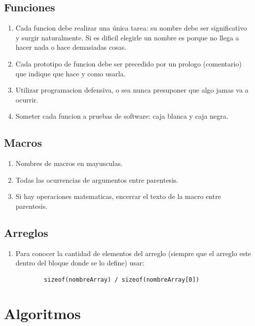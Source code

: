 \documentclass{article}
\begin{document}
\subsection{Funciones}
\begin{enumerate}
    \item Cada funcion debe realizar una única tarea: su nombre debe ser significativo y surgir naturalmente. 
    Si es dificil elegirle un nombre es porque no llega a hacer nada o hace demasiadas cosas.
    \item Cada prototipo de funcion debe ser precedido por un prologo (comentario) que indique que hace y como usarla.
    \item Utilizar programacion defensiva, o sea nunca presuponer que algo jamas va a ocurrir.
    \item Someter cada funcion a pruebas de software: caja blanca y caja negra.
\end{enumerate}

\subsection{Macros}
\begin{enumerate}
    \item Nombres de macros en mayusculas.
    \item Todas las ocurrencias de argumentos entre parentesis.
    \item Si hay operaciones matematicas, encerrar el texto de la macro entre parentesis.
\end{enumerate}

\subsection{Arreglos}
\begin{enumerate}
    \item Para conocer la cantidad de elementos del arreglo (siempre que el arreglo este dentro del bloque donde se 
    lo define) usar:
    \begin{lstlisting}
        sizeof(nombreArray) / sizeof(nombreArray[0])
    \end{lstlisting}
\end{enumerate}

\newpage
\section{Algoritmos}
\end{document}
